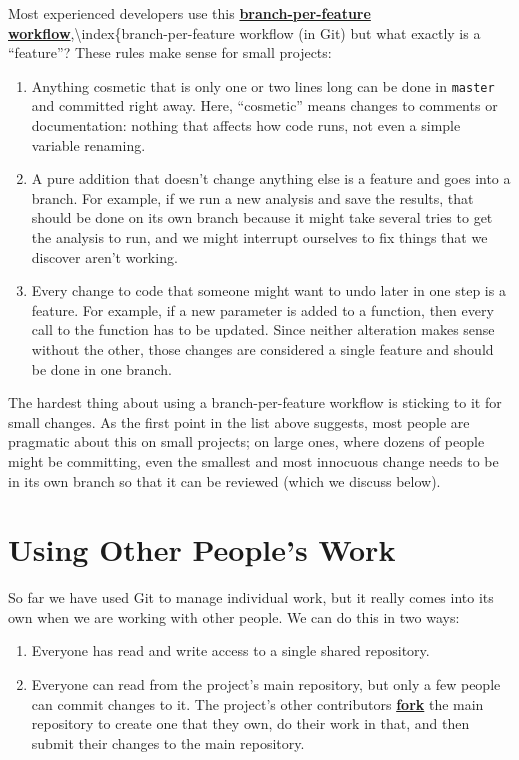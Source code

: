 \documentclass[
]{krantz}
\newcommand{\gref}[2]{\hyperlink{#2}{\textbf{#1}}}
\begin{document}
Most experienced developers use this
\gref{branch-per-feature workflow}{branch\_per\_feature\_workflow},\textbackslash index\{branch-per-feature workflow (in Git)
but what exactly is a ``feature''?
These rules make sense for small projects:

\begin{enumerate}
\def\labelenumi{\arabic{enumi}.}
\item
  Anything cosmetic that is only one or two lines long
  can be done in \texttt{master} and committed right away.
  Here,
  ``cosmetic'' means changes to comments or documentation:
  nothing that affects how code runs, not even a simple variable renaming.
\item
  A pure addition that doesn't change anything else is a feature and goes into a branch.
  For example,
  if we run a new analysis and save the results,
  that should be done on its own branch
  because it might take several tries to get the analysis to run,
  and we might interrupt ourselves to fix things that we discover aren't working.
\item
  Every change to code that someone might want to undo later in one step is a feature.
  For example,
  if a new parameter is added to a function,
  then every call to the function has to be updated.
  Since neither alteration makes sense without the other,
  those changes are considered a single feature and should be done in one branch.
\end{enumerate}

The hardest thing about using a branch-per-feature workflow is sticking to it for small changes.
As the first point in the list above suggests,
most people are pragmatic about this on small projects;
on large ones,
where dozens of people might be committing,
even the smallest and most innocuous change needs to be in its own branch
so that it can be reviewed (which we discuss below).

\hypertarget{git-advanced-fork}{%
\section{Using Other People's Work}\label{git-advanced-fork}}

So far we have used Git to manage individual work,
but it really comes into its own when we are working with other people.
We can do this in two ways:

\begin{enumerate}
\def\labelenumi{\arabic{enumi}.}
\item
  Everyone has read and write access to a single shared repository.
\item
  Everyone can read from the project's main repository,
  but only a few people can commit changes to it.
  The project's other contributors \gref{fork}{git\_fork} the main repository
  to create one that they own,
  do their work in that,
  and then submit their changes to the main repository.
\end{enumerate}
\end{document}
